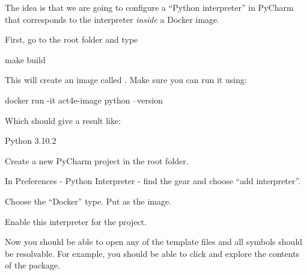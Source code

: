 The idea is that we are going to configure a ``Python interpreter'' in PyCharm that corresponds to the interpreter \emph{inside} a Docker image.

First, go to the root folder and type
\begin{console}
    make build
\end{console}
This will create an image called .
Make sure you can run it using:
\begin{console}
    docker run -it act4e-image python --version
\end{console}
Which should give a result like:
\begin{console}
    Python 3.10.2
\end{console}

Create a new PyCharm project in the root folder.

In Preferences - Python Interpreter - find the gear and choose ``add interpreter''.

Choose the ``Docker'' type.
Put  as the image.

Enable this interpreter for the project.

Now you should be able to open any of the template files and all symbols should be resolvable.
For example, you should be able to click  and explore the contents of the package.

